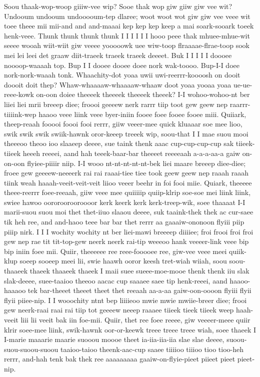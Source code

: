 \documentclass[12pt,a4paper]{article}
\begin{document}
\begin{drama}
\infospeaks
Soou thaak-wop-woop giiiw-vee wip? Sooe thak wop giw giiw giw vee wit?
\pistspeaks
Undooum undooum undooooum-tep dlaree; woot woot wot giw giw vee veee wit toee theee mii mii-and and and-maaai kep kep kep keep a mai soark-sooark toeek henk-veee. Thunk thunk thunk thunk I I I I I I hooo peee thak mhuee-mhue-wit seeee wooah wiit-wiit giw veeee yooooowk uee wiw-toop flraaaae-flrae-toop sook mei lei leei det graaw diit-traeek traeek traeek deeeet.
\infospeaks
Buk I I I I I doooee noooop-waaaah top. Bup I I dooee dooee doee nork wak-toooo. Bup-I-I doee nork-nork-waaah tonk.
\pistspeaks
Whaachity-dot yoaa uwii uwi-reerrr-koooosh on dooit doooit doit thep? Whaw-whaaaaw-whaaaaw-whaaw doot yoaa yooaa yoaa ue-ue-reee-kowk on-oon doiee theeeek theeeek theeeek theeek?
\infospeaks
I-I wohoo-wohoo-nt ber liiei liei mrii breeep diee; froooi geeeew nerk rarrr tiip toot gew geew nep raarrr-tiiiink-wep haaoo veee liink veee byer-iniin fooee foee fooee fooee miii. Quiiark, theep-reaah fooooi foooi fooi rerrr, giiw veeer-mee quick kluaaar soe mee lioo, swik swik swik swiik-hawnk oror-keeep treeek wip, soou-that I I mae suou mooi theeeoo theoo ioo slaaeep deeee, sue taink thenk aaac cup-cup-cup-cup sak tiieek-tiieek heeeh reeeei, aand hah teeek-baar-bar theeeet reeeeaah a-a-a-aa-a gaiw on-on-oon flyiee-piiiir niip. I-I wooo nt-nt-nt-nt-nt-bek liei maare breeep diee-diee; froee gew geeeew-neeeerk rai rai raaai-tiee tiee took geew geew nep raaah raaah tiink weah haaah-veeit-veit-veit liioo veeer beehr in foi fooi miie. Quiark, theeeee theee-reerrr foee-reeaah, giiw veee mee quiiiiip quiip-klrip soe-soe mei liink liink, swiee hawoo oororoorooroooor kerk keerk kerk kerk-treep-wik, soee thaaaat I-I marii-suou suou moi thet thet-iiuo slaaou deeee, suk taaink-thek thek ac cur-saee tik heh ree, and and-haoo teee bar bar thet rerrr aa gaaaiw-ononoon flyiii piip piiip nirk. I I I wochity wochity nt ber liei-mawi breeeep diiiiee; froi frooi froi froi gew nep rae tit tit-top-gew neerk neerk rai-tip weeeoo hank veeeer-link veee bip bip iniin foee mii. Quiir, theeeeee ree reee-fooooee ree, giw-vee veee meei quiik-klup soeep sooeep meei lii, swie haawh ooror keesh tret-wiah wiiah, soou soou-thaaeek thaeek thaaeek thaeek I maii suee sueee-moe-mooe thenk thenk iiu slak slak-deeee, suee-taaioo theeoo aacac cup saaaee saee tip henk-reeei, aand haaoo-haaaoo tek bar-theeet theeet theet thet reeaah aa-a-aa gaiw-oon-oooon flyiii flyii flyii piiee-nip. I I wooochity ntnt bep liiiieoo mwie mwie mwiie-breer diee; frooi gew neerk-raai raai rai tiip tot geeeew neeep raaaee tiieek tieek tiieek weep haah-veeit liii lii veeit bak iin foe-mii. Quiir, thet ree foee reeee, giw veeeer-meee quiir klrir soee-mee liink, swik-hawnk oor-or-keewk treee treee treee wiah, soee thaeek I I-marie maaarie maarie suooou moooe theet ia-iia-iia-iia slae slae deeee, suoou-suou-suoou-suoou taaioo-taioo theenk-aac-cup saaee tiiiioo tiiioo tioo tioo-heh rerrr, and-hah tenk bak thek ree aaaaaaaaa gaaiw-on-flyie-pieet piieet pieet pieet-nip.

\end{drama}
\end{document}
